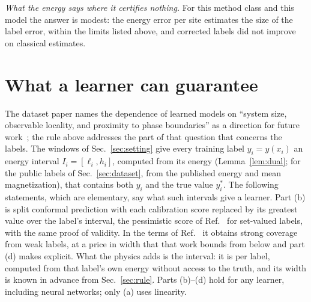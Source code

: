 \documentclass[aps,prx,twocolumn,10pt,superscriptaddress,nofootinbib,longbibliography,floatfix]{revtex4-2}
\theoremstyle{remark}
\begin{document}
\emph{What the energy says where it certifies nothing.} For this method class and this model the answer is
modest: the energy error per site estimates the size of the label error, within the limits listed above, and
corrected labels did not improve on classical estimates.



\section{What a learner can guarantee}
\label{sec:learn}

The dataset paper names the dependence of learned models on ``system size, observable locality, and proximity to
phase boundaries'' as a direction for future work~\cite{jaderberg2026}; the rule above addresses the part of that question
that concerns the labels. The windows of
Sec.~\ref{sec:setting} give every training label $y_i=y(x_i)$ an energy interval $I_i=[\ell_i,h_i]$, computed from its
energy (Lemma~\ref{lem:dual}; for the public labels of Sec.~\ref{sec:dataset}, from the published energy and mean
magnetization), that contains both $y_i$ and the true value $y_i^*$. The following statements, which are
elementary, say what such intervals give a learner. Part (b) is split conformal prediction with each calibration
score replaced by its greatest value over the label's interval, the pessimistic score of
Ref.~\cite{javanmardi2023} for set-valued labels, with the same proof of validity. In the terms of
Ref.~\cite{cauchois2022} it obtains strong coverage from weak labels, at a price in width that that work bounds
from below and part (d) makes explicit. What the
physics adds is the interval: it is per
label, computed from that label's own energy without access to the truth, and its width is known in advance
from Sec.~\ref{sec:rule}. Parts (b)--(d) hold for any learner, including neural networks; only (a) uses linearity.
\end{document}
